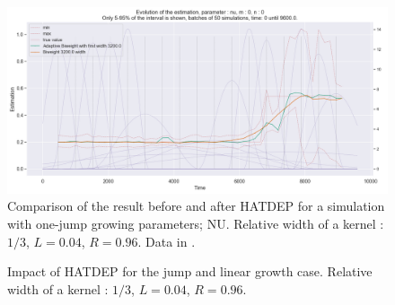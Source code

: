 \begin{figure}
\centering
\includegraphics[width = 0.90 \textwidth]{../imag/chap3/2/3.png}
\caption{Comparison of the result before and after HATDEP for a simulation with one-jump growing parameters; NU. Relative width of a kernel : $1/3$, $L = 0.04$, $R = 0.96$.  Data in \protect {}.}
\label{fig:first_estimate_2_nu}
\end{figure}



















\begin{figure}
\centering
{} 
\caption{Impact of HATDEP for the jump and linear growth case. Relative width of a kernel : $1/3$, $L = 0.04$, $R = 0.96$.}
\label{fig:compar_kernels_3}
\end{figure}

